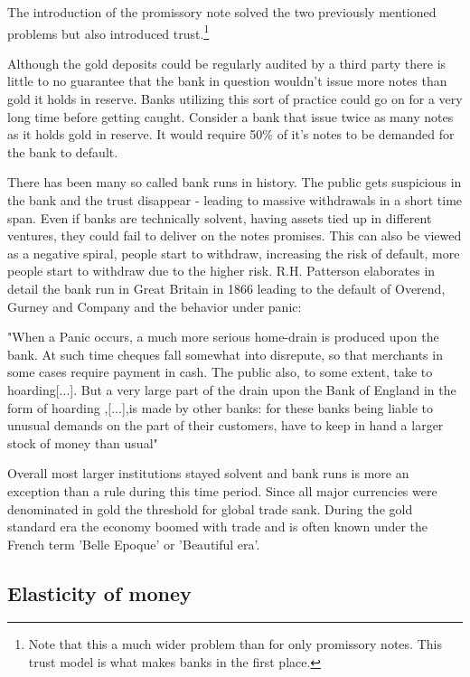 The introduction of the promissory note solved the two previously mentioned problems but also 
introduced trust.\footnote{Note that this a much wider problem than for only promissory notes. This trust model is what makes banks in the first place.} 

Although the gold deposits could be regularly audited by a third party there is little to no guarantee that the bank in question wouldn't issue more notes than gold it holds in reserve. Banks utilizing this sort of practice could go on for a very long time before getting caught. Consider a bank that issue twice as many notes as it holds gold in reserve. It would require 50\% of it's notes to be demanded for the bank to default.  
  
There has been many so called bank runs in history. The public gets suspicious in the bank and the trust disappear - leading to massive withdrawals in a short time span. Even if banks are technically solvent, having assets tied up in different ventures, they could fail to deliver on the notes promises. This can also be viewed as a negative spiral, people start to withdraw, increasing the risk of default, more people start to withdraw due to the higher risk. R.H. Patterson elaborates in detail the bank run in Great Britain in 1866 leading to the default of Overend, Gurney and Company and the behavior under panic: 

\begin{displayquote}
	"When a Panic occurs, a much more serious home-drain is produced upon the bank. At such time cheques fall somewhat into disrepute, so that merchants in some cases require payment in cash. The public also, to some extent, take to hoarding[...]. But a very large part of the drain upon the Bank of England in the form of hoarding ,[...],is made by other banks: for these banks being liable to unusual demands on the part of their customers, have to keep in hand a larger stock of money than usual"\cite{patterson:monetary:drains}
\end{displayquote}

Overall most larger institutions stayed solvent and bank runs is more an exception than a rule during this time period. Since all major currencies were denominated in gold the threshold for global trade sank. During the gold standard era the economy boomed with trade and is often known under the French term 'Belle Epoque' or 'Beautiful era'. 

\subsection{Elasticity of money}

